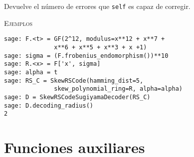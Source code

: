 \begin{description}[font=\ttfamily, style=nextline]
\begin{description}[font=\ttfamily, style=nextline]
        \item[decoding\_radius(self)]
        Devuelve el número de errores que \texttt{self} es capaz de corregir.

        \textsc{Ejemplos}
        \begin{lstlisting}
sage: F.<t> = GF(2^12, modulus=x**12 + x**7 +
              x**6 + x**5 + x**3 + x +1)
sage: sigma = (F.frobenius_endomorphism())**10
sage: R.<x> = F['x', sigma]
sage: alpha = t
sage: RS_C = SkewRSCode(hamming_dist=5,
              skew_polynomial_ring=R, alpha=alpha)
sage: D = SkewRSCodeSugiyamaDecoder(RS_C)
sage: D.decoding_radius()
2
        \end{lstlisting}
    \end{description}
\end{description}

\section{Funciones auxiliares}

